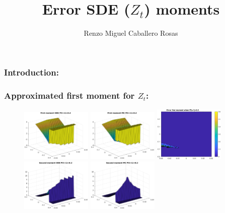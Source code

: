 \documentclass[aspectratio=169]{beamer}\usepackage[utf8]{inputenc}
\title{Error SDE ($Z_t$) moments}
\subtitle{Renzo Miguel Caballero Rosas}
\begin{document}
\begin{frame}
\titlepage
\end{frame}


\begin{frame}\frametitle{Introduction:} \label{S1}



\end{frame}


\begin{frame}\frametitle{Approximated first moment for $Z_t$:}

\begin{figure}[ht!]
\centering
\includegraphics[width=0.3\textwidth]{../../MATLAB_Files/Results/moments/lamperti/errors/fm_ODE_1.eps}\quad
\includegraphics[width=0.3\textwidth]{../../MATLAB_Files/Results/moments/lamperti/errors/fm_MC_1.eps}\quad
\includegraphics[width=0.3\textwidth]{../../MATLAB_Files/Results/moments/lamperti/errors/fm_1.eps}\quad
\includegraphics[width=0.3\textwidth]{../../MATLAB_Files/Results/moments/lamperti/errors/sm_ODE_1.eps}\quad
\includegraphics[width=0.3\textwidth]{../../MATLAB_Files/Results/moments/lamperti/errors/sm_MC_1.eps}\quad

\end{figure}
\end{frame}
\end{document}
